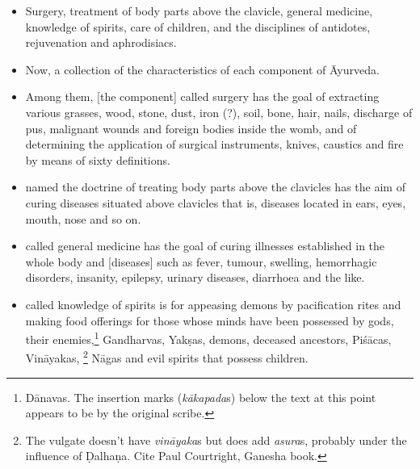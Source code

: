 \documentclass[12pt]{article}
\begin{document}
\begin{itemize}
    \item[7] Surgery, treatment of body parts above the clavicle, general medicine, 
    knowledge of spirits, care of children, and the disciplines of antidotes, rejuvenation 
    and aphrodisiacs.
        \item[8.1a] Now,  a collection of the characteristics of each component of Āyurveda.
        
        \item[8.1b] Among them, [the component] called surgery has the goal of extracting various grasses, wood, stone, dust, iron (?), soil, bone, hair, nails, discharge of pus, malignant wounds and foreign bodies inside the womb, and of determining the application of surgical instruments, knives, caustics and fire by means of sixty definitions.
        
        \item[8.2] [The component] named the doctrine of treating body parts above 
        the clavicles has the aim of curing diseases situated above clavicles that is,  
        diseases located in ears, eyes, mouth, nose and so on.
        
        \item[8.3] [The component] called general medicine has the goal of curing illnesses established in the whole body and [diseases] such as fever, tumour, swelling, hemorrhagic disorders, insanity, epilepsy, urinary diseases, diarrhoea and the like.
        
        \item[8.4] [The component] called knowledge of spirits is for appeasing
demons by pacification rites and making food offerings for those whose
minds have been possessed by gods, their enemies,\footnote{Dānavas.  The
insertion marks (\emph{kākapada}s) below the text at this point appears to
be by the original scribe.} Gandharvas, Yakṣas, demons, deceased
ancestors, Piśācas, Vināyakas, \footnote{The vulgate doesn't have
\emph{vināyaka}s but does add \emph{asura}s, probably under the influence
of Ḍalhaṇa.  Cite Paul Courtright, Ganesha book.} Nāgas and evil spirits
that possess children. %
          

\end{itemize}
\end{document}
